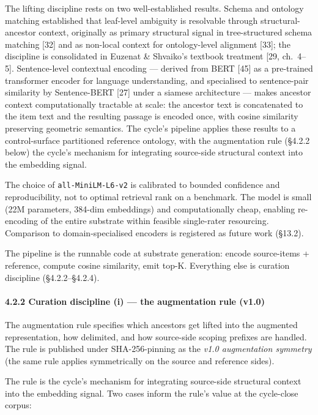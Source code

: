 \documentclass[
]{article}
\begin{document}
The lifting discipline rests on two well-established results. Schema and
ontology matching established that leaf-level ambiguity is resolvable
through structural-ancestor context, originally as primary structural
signal in tree-structured schema matching {[}32{]} and as non-local
context for ontology-level alignment {[}33{]}; the discipline is
consolidated in Euzenat \& Shvaiko's textbook treatment {[}29,
ch.~4--5{]}. Sentence-level contextual encoding --- derived from BERT
{[}45{]} as a pre-trained transformer encoder for language
understanding, and specialised to sentence-pair similarity by
Sentence-BERT {[}27{]} under a siamese architecture --- makes ancestor
context computationally tractable at scale: the ancestor text is
concatenated to the item text and the resulting passage is encoded once,
with cosine similarity preserving geometric semantics. The cycle's
pipeline applies these results to a control-surface partitioned
reference ontology, with the augmentation rule (§4.2.2 below) the
cycle's mechanism for integrating source-side structural context into
the embedding signal.

The choice of \texttt{all-MiniLM-L6-v2} is calibrated to bounded
confidence and reproducibility, not to optimal retrieval rank on a
benchmark. The model is small (22M parameters, 384-dim embeddings) and
computationally cheap, enabling re-encoding of the entire substrate
within feasible single-rater resourcing. Comparison to
domain-specialised encoders is registered as future work (§13.2).

The pipeline is the runnable code at substrate generation: encode
source-items + reference, compute cosine similarity, emit top-K.
Everything else is curation discipline (§4.2.2--§4.2.4).

\paragraph{4.2.2 Curation discipline (i) --- the augmentation rule
(v1.0)}\label{curation-discipline-i-the-augmentation-rule-v1.0}

The augmentation rule specifies which ancestors get lifted into the
augmented representation, how delimited, and how source-side scoping
prefixes are handled. The rule is published under SHA-256-pinning as the
\emph{v1.0 augmentation symmetry} (the same rule applies symmetrically
on the source and reference sides).

The rule is the cycle's mechanism for integrating source-side structural
context into the embedding signal. Two cases inform the rule's value at
the cycle-close corpus:
\end{document}
